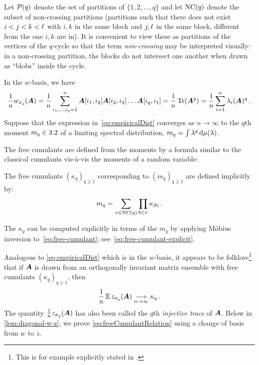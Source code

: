 Let ${\cal P}(q)$ denote the set of partitions of $\{1,2,\dots, q\}$
and let $\textnormal{NC}(q)$ denote the subset of non-crossing partitions (partitions such that there does not exist $i < j < k < \ell$ with $i,k$ in the same block and $j, \ell$ in the same block, different from the one $i,k$ are in).
It is convenient to view these as partitions of the vertices of the $q$-cycle
so that the term \emph{non-crossing} may be interpreted visually: in a non-crossing partition, the blocks do not intersect one another when drawn as ``blobs'' inside the cycle.

In the $w$-basis, we have
\begin{align}
    \frac 1n w_{\sigma_q}({\bm A}) = \frac 1n \sum_{i_1,\ldots,i_q=1}^n {\bm A}[i_1, i_2] {\bm A}[i_2, i_3] \ldots {\bm A}[i_q,i_1] = \frac 1n \Tr({\bm A}^q) = \frac 1n \sum_{i=1}^n \lambda_i({\bm A})^q\,.\label{eq:empiricalDist}
\end{align}
Suppose that the expression in~\cref{eq:empiricalDist} converges as
$n\to\infty$ to the $q$th moment
$m_q\in 3.2$ of a limiting spectral distribution, $m_q = \int \lambda^q\,{\textnormal d} \mu(\lambda)$.

The free cumulants
are defined from the moments by a formula similar to
the classical cumulants vis-{\`a}-vis the moments of a random variable:

\begin{definition}\label{def:free-cumulant}    
    The free cumulants $(\kappa_q)_{q\ge 1}$ corresponding to $(m_q)_{q\ge 1}$ are defined implicitly by:
\begin{equation}\label{eq:free-cumulant}
    m_q = \sum_{\sigma \in \textnormal{NC}(q)} \prod_{b \in \sigma} \kappa_{|b|}\,.
\end{equation}
\end{definition}
\noindent The $\kappa_q$ can be computed explicitly in terms of the $m_q$ by applying M{\"o}bius inversion to~\cref{eq:free-cumulant}; see~\cref{eq:free-cumulant-explicit}.

Analogous to \cref{eq:empiricalDist} which is in the $w$-basis,
it appears to be folklore\footnote{This is for example explicitly stated in \cite[Theorem 1 and Appendix D.1]{MFCKMZ-2019-PlefkaExpansionOrthogonalIsing}.} that if ${\bm A}$ is drawn
from an orthogonally invariant matrix ensemble
with free
cumulants $(\kappa_q)_{q\ge 1}$, then
\begin{align}
    \frac 1n \operatorname*{\mathbb{E}} z_{\sigma_q}({\bm A}) \underset{n\to\infty}{\longrightarrow} \kappa_q\,.\label{eq:freeCumulantRelation}
\end{align}
The quantity $\frac 1n z_{\sigma_q}({\bm A})$ has also been called the $q$th \emph{injective trace} of ${\bm A}$.
Below in \cref{lem:diagonal-w-z}, we prove \cref{eq:freeCumulantRelation} using a change of basis from $w$ to $z$.


